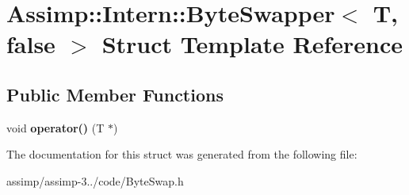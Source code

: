 \hypertarget{struct_assimp_1_1_intern_1_1_byte_swapper_3_01_t_00_01false_01_4}{\section{Assimp\+:\+:Intern\+:\+:Byte\+Swapper$<$ T, false $>$ Struct Template Reference}
\label{struct_assimp_1_1_intern_1_1_byte_swapper_3_01_t_00_01false_01_4}
}
\subsection*{Public Member Functions}
\begin{DoxyCompactItemize}
\item 
\hypertarget{struct_assimp_1_1_intern_1_1_byte_swapper_3_01_t_00_01false_01_4_a6f01bff57b287b44381eb1c5dbebf340}{void {\bfseries operator()} (T $\ast$)}\label{struct_assimp_1_1_intern_1_1_byte_swapper_3_01_t_00_01false_01_4_a6f01bff57b287b44381eb1c5dbebf340}

\end{DoxyCompactItemize}


The documentation for this struct was generated from the following file\+:\begin{DoxyCompactItemize}
\item 
assimp/assimp-\/3../code/Byte\+Swap.\+h\end{DoxyCompactItemize}
